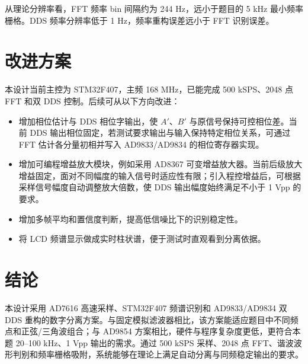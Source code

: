 \documentclass[UTF8,a4paper,zihao=-4]{ctexart}
\begin{document}
从理论分辨率看，FFT 频率 bin 间隔约为 244 Hz，远小于题目的 5 kHz 最小频率栅格。DDS 频率分辨率低于 1 Hz，频率重构误差远小于 FFT 识别误差。

\section{改进方案}

本设计当前主控为 STM32F407，主频 168 MHz，已能完成 500 kSPS、2048 点 FFT 和双 DDS 控制。后续可从以下方向改进：
\begin{itemize}
  \item 增加相位估计与 DDS 相位字输出，使 $A'$、$B'$ 与原信号保持可控相位差。当前 DDS 输出相位固定，若测试要求输出与输入保持特定相位关系，可通过 FFT 估计各分量初相并写入 AD9833/AD9834 的相位寄存器实现。
  \item 增加可编程增益放大模块，例如采用 AD8367 可变增益放大器。当前后级放大增益固定，面对不同幅度的输入信号时适应性有限；引入程控增益后，可根据采样信号幅度自动调整放大倍数，使 DDS 输出幅度始终满足不小于 1 Vpp 的要求。
  \item 增加多帧平均和置信度判断，提高低信噪比下的识别稳定性。
  \item 将 LCD 频谱显示做成实时柱状谱，便于测试时直观看到分离依据。
\end{itemize}

\section{结论}

本设计采用 AD7616 高速采样、STM32F407 频谱识别和 AD9833/AD9834 双 DDS 重构的数字分离方案。与固定模拟滤波器相比，该方案能适应题目中不同频点和正弦/三角波组合；与 AD9854 方案相比，硬件与程序复杂度更低，更符合本题 20--100 kHz、1 Vpp 输出的需求。通过 500 kSPS 采样、2048 点 FFT、谐波波形判别和频率栅格吸附，系统能够在理论上满足自动分离与同频稳定输出的要求。
\end{document}
